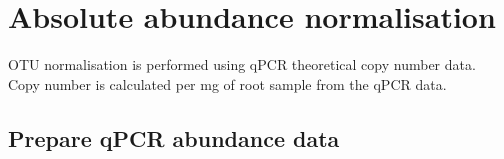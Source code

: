 \documentclass[
]{article}
\newenvironment{Shaded}{\begin{snugshade}}{\end{snugshade}}
\newcommand{\FunctionTok}[1]{\textcolor[rgb]{0.00,0.00,0.00}{#1}}
\newcommand{\NormalTok}[1]{#1}
\newcommand{\OtherTok}[1]{\textcolor[rgb]{0.56,0.35,0.01}{#1}}
\newcommand{\SpecialCharTok}[1]{\textcolor[rgb]{0.00,0.00,0.00}{#1}}
\begin{document}
\begin{Shaded}
\end{Shaded}

\hypertarget{absolute-abundance-normalisation}{%
\section{Absolute abundance
normalisation}\label{absolute-abundance-normalisation}}

OTU normalisation is performed using qPCR theoretical copy number data.
Copy number is calculated per mg of root sample from the qPCR data.

\hypertarget{prepare-qpcr-abundance-data}{%
\subsection{Prepare qPCR abundance
data}\label{prepare-qpcr-abundance-data}}
\end{document}

